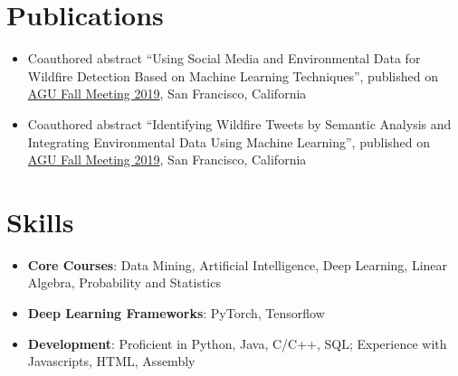 \documentclass[letterpaper,11pt]{article}
\newcommand{\resumeItem}[2]{
  \item\small{
    \textbf{#1}{: #2 \vspace{-2pt}}
  }
}
\newcommand{\resumeSubItem}[2]{\resumeItem{#1}{#2}\vspace{-4pt}}
\newcommand{\resumeSubHeadingListStart}{\begin{itemize}[leftmargin=*]}
\newcommand{\resumeSubHeadingListEnd}{\end{itemize}}
\newcommand{\resumeItemListEnd}{\end{itemize}\vspace{-5pt}}
\begin{document}
      
        
%

\section{Publications}
 \resumeSubHeadingListStart

       
   \item{Coauthored abstract ``Using Social Media and Environmental Data for Wildfire Detection Based on Machine Learning Techniques'', published on \href{https://www.agu.org/fall-meeting}{AGU Fall Meeting 2019}, San Francisco, California}
   \item{Coauthored abstract ``Identifying Wildfire Tweets by Semantic Analysis and Integrating Environmental Data Using Machine Learning'', published on \href{https://www.agu.org/fall-meeting}{AGU Fall Meeting 2019}, San Francisco, California}
       

\resumeSubHeadingListEnd


\section{Skills}
 \resumeSubHeadingListStart
   \item{
      \textbf{Core Courses}{: Data Mining, Artificial Intelligence, Deep Learning, Linear Algebra, Probability and Statistics}
   }
   \item{
      \textbf{Deep Learning Frameworks}{: PyTorch, Tensorflow}
   }
   \item{
      \textbf{Development}{: Proficient in Python, Java, C/C++, SQL; Experience with Javascripts, HTML, Assembly}
   }
 \resumeSubHeadingListEnd
 
   


\end{document}
